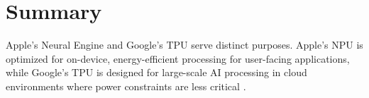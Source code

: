 \documentclass{article}
\begin{document}
\section*{Summary}
Apple’s Neural Engine and Google’s TPU serve distinct purposes. Apple’s NPU is optimized for on-device, energy-efficient processing for user-facing applications, while Google’s TPU is designed for large-scale AI processing in cloud environments where power constraints are less critical \cite{OpenAI}.

\end{document}
